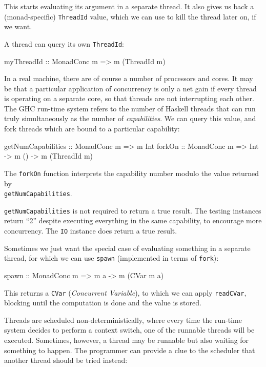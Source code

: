 This starts evaluating its argument in a separate thread. It also
gives us back a (monad-specific) \verb|ThreadId| value, which we can
use to kill the thread later on, if we want.

A thread can query its own \verb|ThreadId|:

\begin{haskellcode}
myThreadId :: MonadConc m => m (ThreadId m)
\end{haskellcode}

In a real machine, there are of course a number of processors and
cores. It may be that a particular application of concurrency is only
a net gain if every thread is operating on a separate core, so that
threads are not interrupting each other. The GHC run-time system
refers to the number of Haskell threads that can run truly
simultaneously as the number of \emph{capabilities}. We can query this
value, and fork threads which are bound to a particular capability:

\begin{haskellcode}
getNumCapabilities :: MonadConc m => m Int
forkOn :: MonadConc m => Int -> m () -> m (ThreadId m)
\end{haskellcode}

The \verb|forkOn| function interprets the capability number modulo the
value returned by \\\verb|getNumCapabilities|.

\begin{departure}
  \verb|getNumCapabilities| is not required to return a true
  result. The testing instances return ``2'' despite executing
  everything in the same capability, to encourage more
  concurrency. The \verb|IO| instance does return a true result.
\end{departure}

Sometimes we just want the special case of evaluating something in a
separate thread, for which we can use \verb|spawn| (implemented in
terms of \verb|fork|):

\begin{haskellcode}
spawn :: MonadConc m => m a -> m (CVar m a)
\end{haskellcode}

This returns a \verb|CVar| (\emph{Concurrent Variable}), to which we
can apply \verb|readCVar|, blocking until the computation is done and
the value is stored.

Threads are scheduled non-deterministically, where every time the
run-time system decides to perform a context switch, one of the
runnable threads will be executed. Sometimes, however, a thread may be
runnable but also waiting for something to happen. The programmer can
provide a clue to the scheduler that another thread should be tried
instead:

